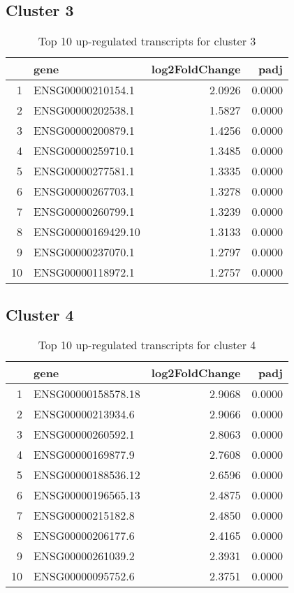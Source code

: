 \documentclass{article}
\begin{document}
\subsection{Cluster 3 }
\begin{table}[H]
\centering
\begin{tabularx}{\textwidth}{rlrr}
  \hline
 & gene & log2FoldChange & padj \\ 
  \hline
1 & ENSG00000210154.1 & 2.0926 & 0.0000 \\ 
  2 & ENSG00000202538.1 & 1.5827 & 0.0000 \\ 
  3 & ENSG00000200879.1 & 1.4256 & 0.0000 \\ 
  4 & ENSG00000259710.1 & 1.3485 & 0.0000 \\ 
  5 & ENSG00000277581.1 & 1.3335 & 0.0000 \\ 
  6 & ENSG00000267703.1 & 1.3278 & 0.0000 \\ 
  7 & ENSG00000260799.1 & 1.3239 & 0.0000 \\ 
  8 & ENSG00000169429.10 & 1.3133 & 0.0000 \\ 
  9 & ENSG00000237070.1 & 1.2797 & 0.0000 \\ 
  10 & ENSG00000118972.1 & 1.2757 & 0.0000 \\ 
   \hline
\end{tabularx}
\caption{Top 10 up-regulated transcripts for cluster 3} 
\label{tab:q3_1_3}
\end{table}
\subsection{Cluster 4 }
\begin{table}[H]
\centering
\begin{tabularx}{\textwidth}{rlrr}
  \hline
 & gene & log2FoldChange & padj \\ 
  \hline
1 & ENSG00000158578.18 & 2.9068 & 0.0000 \\ 
  2 & ENSG00000213934.6 & 2.9066 & 0.0000 \\ 
  3 & ENSG00000260592.1 & 2.8063 & 0.0000 \\ 
  4 & ENSG00000169877.9 & 2.7608 & 0.0000 \\ 
  5 & ENSG00000188536.12 & 2.6596 & 0.0000 \\ 
  6 & ENSG00000196565.13 & 2.4875 & 0.0000 \\ 
  7 & ENSG00000215182.8 & 2.4850 & 0.0000 \\ 
  8 & ENSG00000206177.6 & 2.4165 & 0.0000 \\ 
  9 & ENSG00000261039.2 & 2.3931 & 0.0000 \\ 
  10 & ENSG00000095752.6 & 2.3751 & 0.0000 \\ 
   \hline
\end{tabularx}
\caption{Top 10 up-regulated transcripts for cluster 4} 
\label{tab:q3_1_4}
\end{table}
\end{document}
